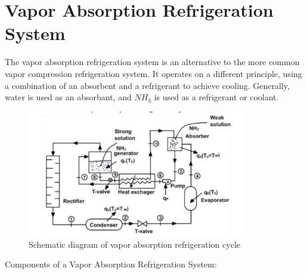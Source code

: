 \documentclass{article}
\begin{document}
\section{Vapor Absorption Refrigeration System}

The vapor absorption refrigeration system is an alternative to the more common vapor compression refrigeration system. It operates on a different principle, using a combination of an absorbent and a refrigerant to achieve cooling. Generally, water is used as an absorbant, and $NH_3$ is used as a refrigerant or coolant.\\

\begin{figure}[htbp]
  \centering
  \includegraphics[width=0.85\textwidth]{img/vars_cycle.png}
  \caption{Schematic diagram of vapor absorption refrigeration cycle}
  \label{fig:vars_cycle}
\end{figure}

Components of a Vapor Absorption Refrigeration System:\\
\end{document}
